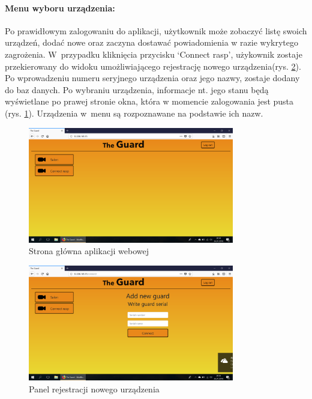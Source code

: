 \paragraph{Menu wyboru urządzenia:} Po prawidłowym zalogowaniu do aplikacji, użytkownik może zobaczyć listę swoich urządzeń, dodać nowe oraz zaczyna dostawać powiadomienia w razie wykrytego zagrożenia. W~przypadku kliknięcia przycisku `Connect rasp', użykownik zostaje przekierowany do widoku umożliwiającego rejestrację nowego urządzenia(rys. \ref{web_register}). Po wprowadzeniu numeru seryjnego urządzenia oraz jego nazwy, zostaje dodany do baz danych. Po wybraniu urządzenia, informacje nt. jego stanu będą wyświetlane po prawej stronie okna, która w momencie zalogowania jest pusta (rys. \ref{web_main_page}). Urządzenia w~menu są rozpoznawane na podstawie ich nazw. 
\begin{figure}[ht]
	\centering
	\includegraphics[width=9cm]{web_screenshots/main.png}
	\caption{Strona główna aplikacji webowej}
	\label{web_main_page}
\end{figure}
\begin{figure}[ht]
	\centering
	\includegraphics[width=9cm]{web_screenshots/add_rasp.png}
	\caption{Panel rejestracji nowego urządzenia}
	\label{web_register}
\end{figure}

